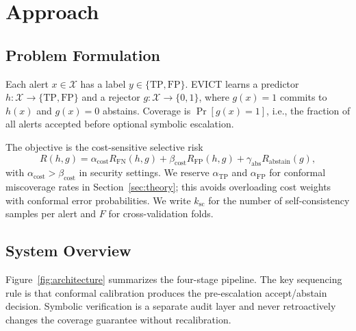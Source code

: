 \section{Approach}
\label{sec:methodology}

\subsection{Problem Formulation}

Each alert $x\in\mathcal{X}$ has a label $y\in\{\mathrm{TP},\mathrm{FP}\}$. EVICT learns a predictor $h:\mathcal{X}\rightarrow\{\mathrm{TP},\mathrm{FP}\}$ and a rejector $g:\mathcal{X}\rightarrow\{0,1\}$, where $g(x)=1$ commits to $h(x)$ and $g(x)=0$ abstains. Coverage is $\Pr[g(x)=1]$, i.e., the fraction of all alerts accepted before optional symbolic escalation.

The objective is the cost-sensitive selective risk
\begin{equation}
R(h,g)=\alpha_{\mathrm{cost}} R_{\mathrm{FN}}(h,g)+\beta_{\mathrm{cost}} R_{\mathrm{FP}}(h,g)+\gamma_{\mathrm{abs}} R_{\mathrm{abstain}}(g),
\end{equation}
with $\alpha_{\mathrm{cost}}>\beta_{\mathrm{cost}}$ in security settings. We reserve $\alpha_{\mathrm{TP}}$ and $\alpha_{\mathrm{FP}}$ for conformal miscoverage rates in Section~\ref{sec:theory}; this avoids overloading cost weights with conformal error probabilities. We write $k_{\mathrm{sc}}$ for the number of self-consistency samples per alert and $F$ for cross-validation folds.

\subsection{System Overview}

Figure~\ref{fig:architecture} summarizes the four-stage pipeline. The key sequencing rule is that conformal calibration produces the pre-escalation accept/abstain decision. Symbolic verification is a separate audit layer and never retroactively changes the coverage guarantee without recalibration.

